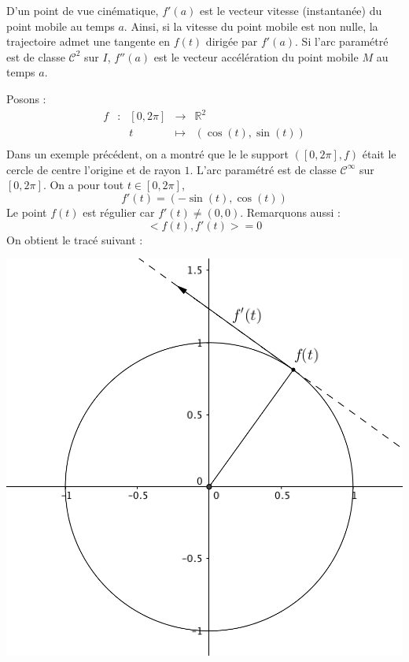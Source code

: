 \documentclass[a4paper,10pt]{report}
\begin{document}
\medskip

\begin{Remarque}{}
D'un point de vue cinématique, $f'(a)$ est le vecteur vitesse (instantanée) du point mobile au temps $a$. Ainsi, si la vitesse du point mobile est non nulle, la trajectoire  admet une tangente en $f(t)$ dirigée par $f'(a)$. Si l'arc paramétré est de classe $\mathcal{C}^2$ sur $I$, $f''(a)$ est le vecteur accélération du point mobile $M$ au temps $a$.
\end{Remarque}

\medskip

\begin{Exemple} Posons :
$$ \begin{array}{ccccl}
f & : & [0,2 \pi] & \rightarrow & \mathbb{R}^2 \\
 & & t & \mapsto & (\cos(t), \sin(t)) \\
\end{array}$$
Dans un exemple précédent, on a montré que le le support $([0,2\pi],f)$ était le cercle de centre l'origine et de rayon $1$. L'arc paramétré est de classe $\mathcal{C}^{\infty}$ sur $[0,2\pi]$. On a pour tout $t \in [0, 2 \pi]$,
$$ f'(t) = (-\sin(t),\cos(t))$$
Le point $f(t)$ est régulier car $f'(t) \neq (0,0)$. Remarquons aussi :
$$ <f(t),f'(t)> = 0$$
On obtient le tracé suivant :

\begin{center}
\includegraphics[scale=0.4]{cercle}
\end{center}
\end{Exemple}
\end{document}
